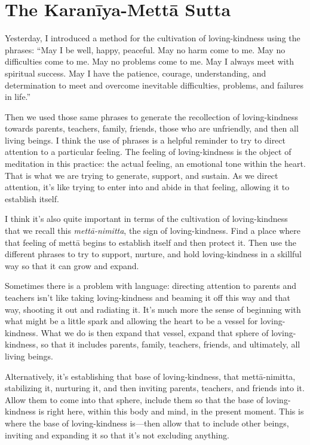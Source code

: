 \chapter{The Karanīya-Mettā
Sutta}

Yesterday, I introduced a method for the cultivation of loving-kindness
using the phrases: “May I be well, happy, peaceful. May no harm come to
me. May no difficulties come to me. May no problems come to me. May I
always meet with spiritual success. May I have the patience, courage,
understanding, and determination to meet and overcome inevitable
difficulties, problems, and failures in life.”

Then we used those same phrases to generate the recollection of
loving-kindness towards parents, teachers, family, friends, those who
are unfriendly, and then all living beings. I think the use of phrases
is a helpful reminder to try to direct attention to a particular
feeling. The feeling of loving-kindness is the object of meditation in
this practice: the actual feeling, an emotional tone within the heart.
That is what we are trying to generate, support, and sustain. As we
direct attention, it’s like trying to enter into and abide in that
feeling, allowing it to establish itself.

I think it’s also quite important in terms of the cultivation of
loving-kindness that we recall this \emph{mettā-nimitta}, the sign of
loving-kindness. Find a place where that feeling of mettā begins to
establish itself and then protect it. Then use the different phrases to
try to support, nurture, and hold loving-kindness in a skillful way so
that it can grow and expand.

Sometimes there is a problem with language: directing attention to
parents and teachers isn’t like taking loving-kindness and beaming it
off this way and that way, shooting it out and radiating it. It’s much
more the sense of beginning with what might be a little spark and
allowing the heart to be a vessel for loving-kindness. What we do is
then expand that vessel, expand that sphere of loving-kindness, so that
it includes parents, family, teachers, friends, and ultimately, all
living beings.

Alternatively, it’s establishing that base of loving-kindness, that
mettā-nimitta, stabilizing it, nurturing it, and then inviting parents,
teachers, and friends into it. Allow them to come into that sphere,
include them so that the base of loving-kindness is right here, within
this body and mind, in the present moment. This is where the base of
loving-kindness is—then allow that to include other beings, inviting and
expanding it so that it’s not excluding anything.

